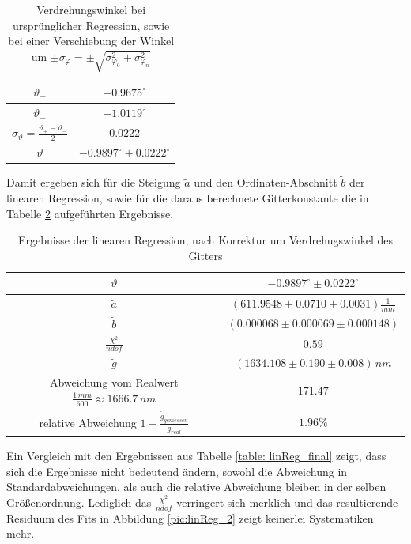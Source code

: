 \documentclass[a4paper, 11pt]{article}
\begin{document}
\begin{table}[H]
	\renewcommand{\arraystretch}{1.5}
	\large
	\centering
	\begin{tabular}{|c|c|}
		\hline
		$\vartheta_+$	&	$ -0.9675^\circ $ \\
		\hline
		$\vartheta_-$	&	$ -1.0119^\circ $ \\
		\hline
		$\sigma_{\vartheta} = \frac{\vartheta_+ - \vartheta_-}{2}$	&	$ 0.0222 $ \\
		\hline
		$\vartheta$		&	$ -0.9897^\circ \pm 0.0222^\circ $	\\
		\hline
	\end{tabular}
	\caption{Verdrehungswinkel bei ursprünglicher Regression, sowie bei einer Verschiebung der Winkel um $\pm \sigma_{\varphi} = \pm \sqrt{\sigma_{\varphi_0}^2 + \sigma_{\varphi_n}^2} $}
	\label{table: theta}
\end{table}

Damit ergeben sich für die Steigung $\tilde{a}$ und den Ordinaten-Abschnitt $\tilde{b}$ der linearen Regression, sowie für die daraus berechnete Gitterkonstante die in Tabelle \ref{table: linReg_2_final} aufgeführten Ergebnisse.

\begin{table}[H]
	\renewcommand{\arraystretch}{1.5}
	\large
	\centering
	\begin{tabular}{|c|c|}
		\hline
		$\vartheta$		&	$ -0.9897^\circ \pm 0.0222^\circ $	\\
		\hline
		$\tilde{a}$ &	$(611.9548 \pm 0.0710 \pm 0.0031) \frac{1}{mm}$ \\
		\hline
		$\tilde{b}$	&	$(0.000068 \pm 0.000069 \pm 0.000148) $ \\
		\hline
		$\frac{\chi^2}{ndof}$	&	$0.59$	\\
		\hline
		$\tilde{g}$	&	$(1634.108 \pm 0.190 \pm 0.008)\, nm$ \\
		\hline
		Abweichung vom Realwert $\frac{1 \,mm}{600} \approx	1666.7\, nm$	&	$ 171.47 $ \\
		\hline
		relative Abweichung $1 - \frac{\tilde{g}_{gemessen}}{g_{real}}$ &	$ 1.96 \%$ \\
		\hline
	\end{tabular}
	\caption{Ergebnisse der linearen Regression, nach Korrektur um Verdrehugswinkel des Gitters}
	\label{table: linReg_2_final}
\end{table}
Ein Vergleich mit den Ergebnissen aus Tabelle \ref{table: linReg_final} zeigt, dass sich die Ergebnisse nicht bedeutend ändern, sowohl die Abweichung in Standardabweichungen, als auch die relative Abweichung bleiben in der selben Größenordnung. Lediglich das $\frac{\chi^2}{ndof}$ verringert sich merklich und das resultierende Residuum des Fits in Abbildung \ref{pic:linReg_2} zeigt keinerlei Systematiken mehr.
\end{document}

